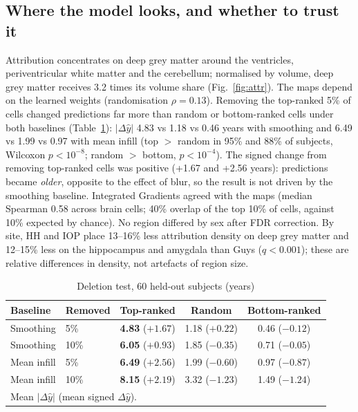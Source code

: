 \documentclass[conference]{IEEEtran}
\begin{document}
\subsection{Where the model looks, and whether to trust it}
Attribution concentrates on deep grey matter around the ventricles, periventricular white matter and the cerebellum; normalised by volume, deep grey matter receives 3.2 times its volume share (Fig.~\ref{fig:attr}). The maps depend on the learned weights (randomisation $\rho=0.13$). Removing the top-ranked 5\% of cells changed predictions far more than random or bottom-ranked cells under both baselines (Table~\ref{tab:del}): $|\Delta\hat{y}|$ 4.83 vs 1.18 vs 0.46 years with smoothing and 6.49 vs 1.99 vs 0.97 with mean infill (top $>$ random in 95\% and 88\% of subjects, Wilcoxon $p<10^{-8}$; random $>$ bottom, $p<10^{-4}$). The signed change from removing top-ranked cells was positive (+1.67 and +2.56 years): predictions became \emph{older}, opposite to the effect of blur, so the result is not driven by the smoothing baseline. Integrated Gradients agreed with the maps (median Spearman 0.58 across brain cells; 40\% overlap of the top 10\% of cells, against 10\% expected by chance). No region differed by sex after FDR correction. By site, HH and IOP place 13--16\% less attribution density on deep grey matter and 12--15\% less on the hippocampus and amygdala than Guys ($q<0.001$); these are relative differences in density, not artefacts of region size.

\begin{table}[t]
\caption{Deletion test, 60 held-out subjects (years)}
\label{tab:del}
\centering
\setlength{\tabcolsep}{3pt}
\begin{tabular}{llccc}
\toprule
Baseline & Removed & Top-ranked & Random & Bottom-ranked \\
\midrule
Smoothing & 5\%  & \textbf{4.83} ($+1.67$) & 1.18 ($+0.22$) & 0.46 ($-0.12$) \\
Smoothing & 10\% & \textbf{6.05} ($+0.93$) & 1.85 ($-0.35$) & 0.71 ($-0.05$) \\
Mean infill & 5\%  & \textbf{6.49} ($+2.56$) & 1.99 ($-0.60$) & 0.97 ($-0.87$) \\
Mean infill & 10\% & \textbf{8.15} ($+2.19$) & 3.32 ($-1.23$) & 1.49 ($-1.24$) \\
\bottomrule
\multicolumn{5}{l}{\footnotesize Mean $|\Delta\hat{y}|$ (mean signed $\Delta\hat{y}$).}
\end{tabular}
\end{table}
\end{document}
